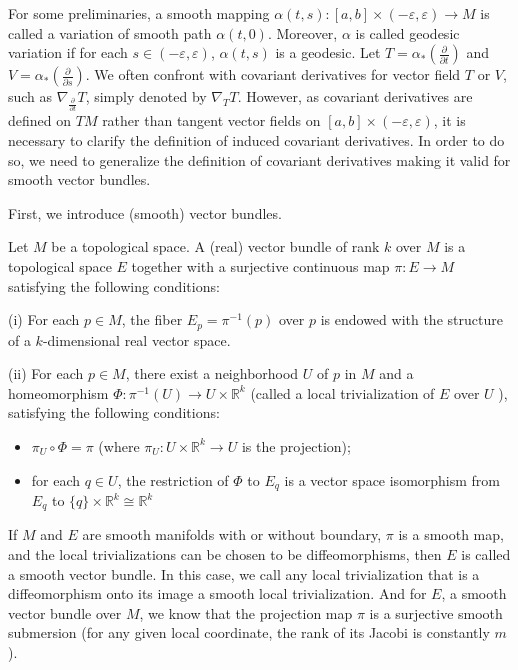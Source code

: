 \documentclass{ctexart}
\begin{document}
For some preliminaries, a smooth mapping $\alpha(t,s):[a,b]\times(-\varepsilon,\varepsilon)\rightarrow M$ is called a variation of smooth path $\alpha(t,0)$.  
Moreover, $\alpha$ is called geodesic variation if for each $s\in (-\varepsilon,\varepsilon)$, $\alpha(t,s)$ is a geodesic. 
Let $T=\alpha_*\left(\frac{\partial}{\partial t}\right)$ and $V=\alpha_*\left(\frac{\partial}{\partial s}\right)$. 
We often confront with covariant derivatives for vector field $T$ or $V$, such as $\nabla_{\frac{\partial}{\partial t}} T$, simply denoted by $\nabla_T T$. 
However, as covariant derivatives are defined on $TM$ rather than tangent vector fields on $[a,b]\times(-\varepsilon,\varepsilon)$, it is necessary to clarify 
the definition of induced covariant derivatives. In order to do so, we need to generalize the definition of covariant derivatives making it valid for smooth vector bundles. 

First, we introduce (smooth) vector bundles.
\begin{definition}
  Let $M$ be a topological space. A (real) vector bundle of rank $k$ over $M$ is a topological space $E$ together with 
  a surjective continuous map $\pi: E \rightarrow M$ satisfying the following conditions:

  (i) For each $p \in M$, the fiber $E_p=\pi^{-1}(p)$ over $p$ is endowed with the structure of a $k$-dimensional real vector space.

  (ii) For each $p \in M$, there exist a neighborhood $U$ of $p$ in $M$ and a homeomorphism $\Phi: \pi^{-1}(U) \rightarrow U \times \mathbb{R}^k$ 
  (called a local trivialization of $E$ over $U$ ), satisfying the following conditions:
  \begin{itemize}
    \item $\pi_U \circ \Phi=\pi$ (where $\pi_U: U \times \mathbb{R}^k \rightarrow U$ is the projection);
    \item for each $q \in U$, the restriction of $\Phi$ to $E_q$ is a vector space isomorphism from $E_q$ to $\{q\} \times \mathbb{R}^k \cong \mathbb{R}^k$
  \end{itemize}
\end{definition}
If $M$ and $E$ are smooth manifolds with or without boundary, $\pi$ is a smooth map, and the local trivializations can be chosen to be diffeomorphisms, 
then $E$ is called a smooth vector bundle. In this case, we call any local trivialization that is a diffeomorphism onto its image a smooth local trivialization. 
And for $E$, a smooth vector bundle over $M$, we know that the projection map $\pi$ is a surjective smooth submersion (for any given local coordinate, 
the rank of its Jacobi is constantly $m$).
\end{document}
